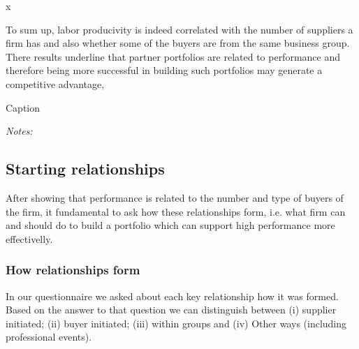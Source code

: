 x\documentclass[final, dvipsnames, authoryear,12pt]{elsarticle}
\begin{document}
To sum up, labor producivity is indeed correlated with the number of suppliers a firm has and also whether some of the buyers are from the same business group. There results underline that partner portfolios are related to performance and therefore being more successful in building such portfolios may generate a competitive advantage,

\begin{table}[H]
    \caption{Caption}
    \label{tab:prod_regs}
    \centerline{}
    {\scriptsize \textit{Notes:}}
\end{table}
    



\subsection{Starting relationships}

After showing that performance is related to the number and type of buyers of the firm, it fundamental to ask how these relationships form, i.e. what firm can and should do to build a portfolio which can support high performance more effectivelly.

\subsubsection{How relationships form}

In our questionnaire we asked about each key relationship how it was formed. Based on the answer to that question we can distinguish between (i) supplier initiated; (ii) buyer initiated; (iii) within groups and (iv) Other ways (including professional events). 
\end{document}
